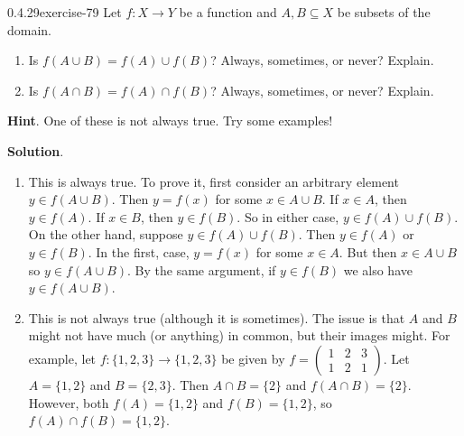 \documentclass[twoside,11pt,]{book}
\numberwithin{equation}{chapter}
\newcommand{\twoline}[2]{\begin{pmatrix}#1 \\ #2 \end{pmatrix}}
\newcommand{\amp}{&}
\begin{document}
\begin{divisionsolution}{0.4.29}{}{exercise-79}%
\hypertarget{p-1168}{}%
Let \(f:X \to Y\) be a function and \(A, B \subseteq X\) be subsets of the domain.\leavevmode%
\begin{enumerate}[label=(\alph*)]
\item\hypertarget{li-927}{}\hypertarget{p-1169}{}%
Is \(f(A \cup B) = f(A) \cup f(B)\)? Always, sometimes, or never? Explain.%
\item\hypertarget{li-928}{}\hypertarget{p-1170}{}%
Is \(f(A \cap B) = f(A) \cap f(B)\)? Always, sometimes, or never? Explain.%
\end{enumerate}
%
\par\smallskip%
\noindent\textbf{Hint}.\quad%
\hypertarget{p-1171}{}%
One of these is not always true.  Try some examples!%
\par\smallskip%
\noindent\textbf{Solution}.\quad%
\hypertarget{p-1172}{}%
\leavevmode%
\begin{enumerate}[label=(\alph*)]
\item\hypertarget{li-929}{}\hypertarget{p-1173}{}%
This is always true. To prove it, first consider an arbitrary element \(y \in f(A \cup B)\). Then \(y = f(x)\) for some \(x \in A \cup B\). If \(x \in A\), then \(y \in f(A)\). If \(x \in B\), then \(y \in f(B)\). So in either case, \(y \in f(A) \cup f(B)\). On the other hand, suppose \(y \in f(A) \cup f(B)\). Then \(y \in f(A)\) or \(y \in f(B)\). In the first, case, \(y = f(x)\) for some \(x \in A\). But then \(x \in A \cup B\) so \(y \in f(A \cup B)\). By the same argument, if \(y \in f(B)\) we also have \(y \in f(A \cup B)\).%
\item\hypertarget{li-930}{}\hypertarget{p-1174}{}%
This is not always true (although it is sometimes). The issue is that \(A\) and \(B\) might not have much (or anything) in common, but their images might. For example, let \(f:\{1,2,3\} \to \{1,2,3\}\) be given by \(f= \twoline{1 \amp 2 \amp 3}{1 \amp 2 \amp 1}\). Let \(A = \{1, 2\}\) and \(B = \{2, 3\}\). Then \(A \cap B = \{2\}\) and \(f(A \cap B) = \{2\}\). However, both \(f(A) = \{1,2\}\) and \(f(B) = \{1,2\}\), so \(f(A) \cap f(B) = \{1,2\}\).%
\end{enumerate}
%
\end{divisionsolution}%
\end{document}
